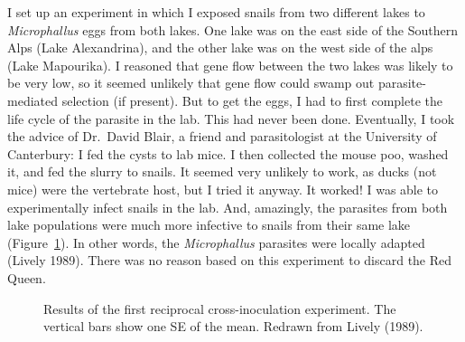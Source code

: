 \documentclass[
  letterpaper,
]{book}
\begin{document}
I set up an experiment in which I exposed snails from two different
lakes to \emph{Microphallus} eggs from both lakes. One lake was on the
east side of the Southern Alps (Lake Alexandrina), and the other lake
was on the west side of the alps (Lake Mapourika). I reasoned that gene
flow between the two lakes was likely to be very low, so it seemed
unlikely that gene flow could swamp out parasite-mediated selection (if
present). But to get the eggs, I had to first complete the life cycle of
the parasite in the lab. This had never been done. Eventually, I took
the advice of Dr.~David Blair, a friend and parasitologist at the
University of Canterbury: I fed the cysts to lab mice. I then collected
the mouse poo, washed it, and fed the slurry to snails. It seemed very
unlikely to work, as ducks (not mice) were the vertebrate host, but I
tried it anyway. It worked! I was able to experimentally infect snails
in the lab. And, amazingly, the parasites from both lake populations
were much more infective to snails from their same lake
(Figure~\ref{fig-4.3}). In other words, the \emph{Microphallus}
parasites were locally adapted (Lively 1989). There was no reason based
on this experiment to discard the Red Queen.

\begin{figure}


\caption[Results of the first reciprocal cross-inoculation
experiment]{\label{fig-4.3}Results of the first reciprocal
cross-inoculation experiment. The vertical bars show one SE of the mean.
Redrawn from Lively (1989).}

\end{figure}%
\end{document}
